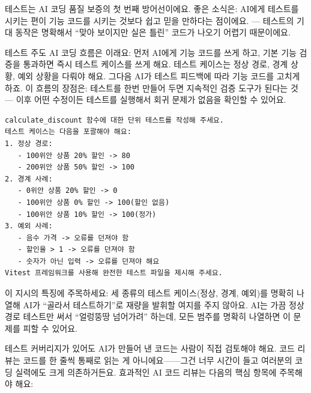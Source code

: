 


테스트는 AI 코딩 품질 보증의 첫 번째 방어선이에요. 좋은 소식은: AI에게 테스트를 시키는 편이 기능 코드를 시키는 것보다 쉽고 믿을 만하다는 점이에요. — 테스트의 기대 동작은 명확해서 “맞아 보이지만 실은 틀린” 코드가 나오기 어렵기 때문이에요.

테스트 주도 AI 코딩 흐름은 이래요: 먼저 AI에게 기능 코드를 쓰게 하고, 기본 기능 검증을 통과하면 즉시 테스트 케이스를 쓰게 해요. 테스트 케이스는 정상 경로, 경계 상황, 예외 상황을 다뤄야 해요. 그다음 AI가 테스트 피드백에 따라 기능 코드를 고치게 하죠. 이 흐름의 장점은: 테스트를 한번 만들어 두면 지속적인 검증 도구가 된다는 것 — 이후 어떤 수정이든 테스트를 실행해서 회귀 문제가 없음을 확인할 수 있어요.

\begin{lstlisting}
calculate_discount 함수에 대한 단위 테스트를 작성해 주세요.
테스트 케이스는 다음을 포괄해야 해요:
1. 정상 경로:
   - 100위안 상품 20% 할인 -> 80
   - 200위안 상품 50% 할인 -> 100
2. 경계 사례:
   - 0위안 상품 20% 할인 -> 0
   - 100위안 상품 0% 할인 -> 100(할인 없음)
   - 100위안 상품 10% 할인 -> 100(정가)
3. 예외 사례:
   - 음수 가격 -> 오류를 던져야 함
   - 할인율 > 1 -> 오류를 던져야 함
   - 숫자가 아닌 입력 -> 오류를 던져야 해요
Vitest 프레임워크를 사용해 완전한 테스트 파일을 제시해 주세요.
\end{lstlisting}

이 지시의 특징에 주목하세요: 세 종류의 테스트 케이스(정상, 경계, 예외)를 명확히 나열해 AI가 “골라서 테스트하기”로 재량을 발휘할 여지를 주지 않아요. AI는 가끔 정상 경로 테스트만 써서 “얼렁뚱땅 넘어가려” 하는데, 모든 범주를 명확히 나열하면 이 문제를 피할 수 있어요.


테스트 커버리지가 있어도 AI가 만들어 낸 코드는 사람이 직접 검토해야 해요. 코드 리뷰는 코드를 한 줄씩 통째로 읽는 게 아니에요——그건 너무 시간이 들고 여러분의 코딩 실력에도 크게 의존하거든요. 효과적인 AI 코드 리뷰는 다음의 핵심 항목에 주목해야 해요:

